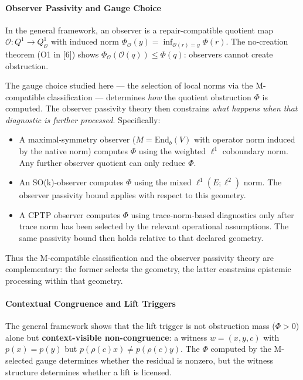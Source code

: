 \documentclass[
  11pt,
]{article}
\providecommand{\tightlist}{%
  \setlength{\itemsep}{0pt}\setlength{\parskip}{0pt}}
\providecommand{\tightlist}{%
  \setlength{\itemsep}{0pt}\setlength{\parskip}{0pt}}
\begin{document}
\paragraph{Observer Passivity and Gauge Choice}\label{observer-passivity-and-gauge-choice}

In the general framework, an observer is a repair-compatible quotient map \(\mathcal O: Q^1 \to Q^1_{\mathcal O}\) with induced norm \(\Phi_{\mathcal O}(y) = \inf_{\mathcal O(r)=y} \Phi(r)\). The no-creation theorem (O1 in {[}6{]}) shows \(\Phi_{\mathcal O}(\mathcal O(q)) \le \Phi(q)\): observers cannot create obstruction.

The gauge choice studied here --- the selection of local norms via the M-compatible classification --- determines \emph{how} the quotient obstruction \(\Phi\) is computed. The observer passivity theory then constrains \emph{what happens when that diagnostic is further processed}. Specifically:

\begin{itemize}
\tightlist
\item
  A maximal-symmetry observer (\(M=\mathrm{End}_b(V)\) with operator norm induced by the native norm) computes \(\Phi\) using the weighted \(\ell^1\) coboundary norm. Any further observer quotient can only reduce \(\Phi\).
\item
  An SO(k)-observer computes \(\Phi\) using the mixed \(\ell^1(E; \ell^2)\) norm. The observer passivity bound applies with respect to this geometry.
\item
  A CPTP observer computes \(\Phi\) using trace-norm-based diagnostics only after trace norm has been selected by the relevant operational assumptions. The same passivity bound then holds relative to that declared geometry.
\end{itemize}

Thus the M-compatible classification and the observer passivity theory are complementary: the former selects the geometry, the latter constrains epistemic processing within that geometry.

\paragraph{Contextual Congruence and Lift Triggers}\label{contextual-congruence-and-lift-triggers}

The general framework shows that the lift trigger is not obstruction mass (\(\Phi > 0\)) alone but \textbf{context-visible non-congruence}: a witness \(w = (x,y,c)\) with \(p(x) = p(y)\) but \(p(\rho(c)x) \neq p(\rho(c)y)\). The \(\Phi\) computed by the M-selected gauge determines whether the residual is nonzero, but the witness structure determines whether a lift is licensed.
\end{document}
